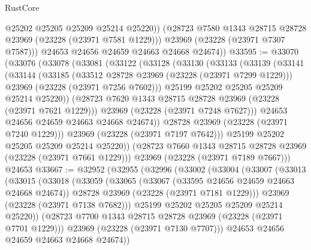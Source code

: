 \begin{lexlean}{RustCore}
\begin{coremodule}
              @25202
              @25205
              @25209
              @25214
              @25220))
          (@28723 @7580 @1343 @28715 @28728 @23969 (@23228 (@23971 @7581 @1229)))
          @23969
          (@23228 (@23971 @7307 @7587)))
        @24653
        @24656
        @24659
        @24663
        @24668
        @24674))
@33595 := @33070
    (@33076
      (@33078
        (@33081
          (@33122
            (@33128
              (@33130
                (@33133
                  (@33139
                    (@33141
                      (@33144
                        (@33185
                          (@33512 @28728 @23969 (@23228 (@23971 @7299 @1229)))
                          @23969
                          (@23228 (@23971 @7256 @7602)))
                        @25199
                        @25202
                        @25205
                        @25209
                        @25214
                        @25220))
                    (@28723 @7620 @1343 @28715 @28728 @23969 (@23228 (@23971 @7621 @1229)))
                    @23969
                    (@23228 (@23971 @7248 @7627)))
                  @24653
                  @24656
                  @24659
                  @24663
                  @24668
                  @24674))
              @28728
              @23969
              (@23228 (@23971 @7240 @1229)))
            @23969
            (@23228 (@23971 @7197 @7642)))
          @25199
          @25202
          @25205
          @25209
          @25214
          @25220))
      (@28723 @7660 @1343 @28715 @28728 @23969 (@23228 (@23971 @7661 @1229)))
      @23969
      (@23228 (@23971 @7189 @7667)))
    @24653
@33667 := @32952
    (@32955
      (@32996
        (@33002
          (@33004
            (@33007
              (@33013
                (@33015
                  (@33018
                    (@33059
                      (@33065
                        (@33067 (@33595 @24656 @24659 @24663 @24668 @24674))
                        @28728
                        @23969
                        (@23228 (@23971 @7181 @1229)))
                      @23969
                      (@23228 (@23971 @7138 @7682)))
                    @25199
                    @25202
                    @25205
                    @25209
                    @25214
                    @25220))
                (@28723 @7700 @1343 @28715 @28728 @23969 (@23228 (@23971 @7701 @1229)))
                @23969
                (@23228 (@23971 @7130 @7707)))
              @24653
              @24656
              @24659
              @24663
              @24668
              @24674))

\end{coremodule}
\end{lexlean}
